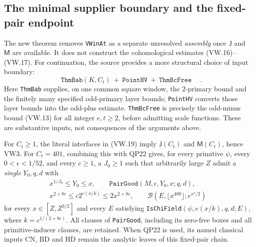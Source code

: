 \subsection{The minimal supplier boundary and the fixed-pair endpoint}

The new theorem removes \texttt{VWinAt} as a separate unresolved
\emph{assembly} once $\mathsf J$ and $\mathsf M$ are available.  It does
not construct the cohomological estimates (VW.16)--(VW.17).
For continuation, the source provides a more structural choice of input
boundary:
\[
 \boxed{\quad
 \mathtt{ThmBab}(K,C_t)\ +\ \mathtt{PointHV}\ +\ \mathtt{ThmBcFree}
 \quad}\ .
 \tag{VW.19}
\]
Here \texttt{ThmBab} supplies, on one common square window, the
$2$-primary bound and the finitely many specified odd-primary layer
bounds; \texttt{PointHV} converts those layer bounds into the
odd-plus estimate.  \texttt{ThmBcFree} is precisely the odd-minus
bound (VW.13) for all integer $e,t\ge2$, before admitting scale functions.
These are substantive inputs, not consequences of the arguments above.

\begin{proposition}
\label{prop:vw-fixed-pair}
For $C_t\ge1$, the literal interfaces in (VW.19) imply
$\mathsf J(C_t)$ and $\mathsf M(C_t)$, hence VW3.
For $C_t=401$, combining this with QP22 gives, for every primitive
$\psi$, every $0<\epsilon<1/52$, and every $c\ge1$, a $J_0\ge1$
such that arbitrarily large $Z$ admit a \emph{single} $Y_0,q,d$ with
\[
 \begin{gathered}
 x^{1/J_0}\le Y_0\le x,\qquad
       \mathtt{PairGood}(M,\epsilon,Y_0,x;q,d),\\
 x^{2+8\epsilon}\le c2^{e(x/k)}\le2x^{2+8\epsilon},\qquad
 \mathcal B(E,\lfloor x^{400}\rfloor;e^{x^\epsilon/2})
 \end{gathered}
 \tag{VW.20}
\]
for every $x\in[Z,Z^{3/2}]$ and every
$E$ satisfying \texttt{IsChiField}$(\psi,e(x/k),q,d;E)$, where
$k=c^{1/(2+8\epsilon)}$.  All clauses of \texttt{PairGood}, including
its zero-free boxes and all primitive-inducer clauses, are retained.
When QP22 is used, its named classical inputs CN, BD and HD remain the
analytic leaves of this fixed-pair chain.
\end{proposition}

